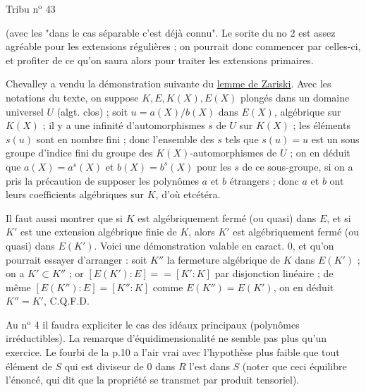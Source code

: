 
Tribu \quad n$^{\mathrm{o}}$ 43

(avec les "dans le cas séparable c'est déjà connu". Le sorite du no 2 est assez agréable pour les extensions régulières ; on pourrait donc commencer par celles-ci, et profiter de ce qu'on saura alors pour traiter les extensions primaires.

Chevalley a vendu la démonstration suivante du \uline{lemme de Zariski}. Avec les notations du texte, on suppose $K,E,K(X),E(X)$ plongés dans un domaine universel $U$ (algt. clos) ; soit $u=a(X)/b(X)$ dans $E(X)$, algébrique sur $K(X)$ ; il y a une infinité d'automorphismes $s$ de $U$ sur $K(X)$ ; les éléments $s(u)$ sont en nombre fini ; donc l'ensemble des $s$ tels que $s(u)=u$ est un sous groupe d'indice fini du groupe des $K(X)$-automorphismes de $U$ ; on en déduit que $a(X)=a^s(X)$ et $b(X)=b^s(X)$ pour les $s$ de ce sous-groupe, si on a pris la précaution de supposer les polynômes $a$ et $b$ étrangers ; donc $a$ et $b$ ont leurs coefficients algébriques sur $K$, d'où etcétéra.

Il faut aussi montrer que si $K$ est algébriquement fermé (ou quasi) dans $E$, et si $K'$ est une extension algébrique finie de $K$, alors $K'$ est algébriquement fermé (ou quasi) dans $E(K')$. Voici une démonstration valable en caract. $0$, et qu'on pourrait essayer d'arranger : soit $K''$ la fermeture algébrique de $K$ dans $E(K')$ ; on a $K'\subset K''$ ; or $[E(K'):E]==[K':K]$ par disjonction linéaire ; de même $[E(K''):E]=[K'':K]$ comme $E(K'')=E(K')$, on en déduit $K''=K'$, C.Q.F.D.

Au n$^{\mathrm{o}}$ 4 il faudra expliciter le cas des idéaux principaux (polynômes irréductibles). La remarque d'équidimensionalité ne semble pas plus qu'un exercice. Le fourbi de la p.10 a l'air vrai avec l'hypothèse plus faible que tout élément de $S$ qui est diviseur de $0$ dans $R$ l'est dans $S$ (noter que ceci équilibre l'énoncé, qui dit que la propriété se transmet par produit tensoriel).


